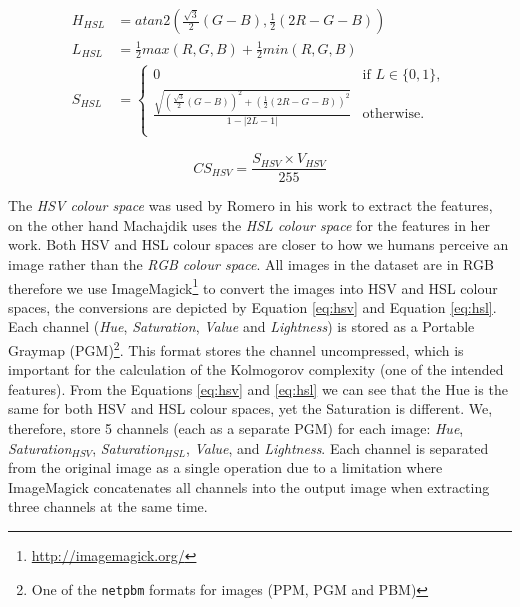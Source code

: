 \documentclass[11pt,a4paper,draft]{report}
\begin{document}
\begin{multicols}{2}
\begin{figure}[!htb]
\begin{equation}
\begin{aligned}
H_{HSL}  &= atan2\left(\frac{\sqrt{3}}{2}(G-B), \frac{1}{2}(2R-G-B)\right) \\
L_{HSL}  &= \frac{1}{2}max(R,G,B) + \frac{1}{2}min(R,G,B) \\
S_{HSL}  &= \left\{
  \begin{array}{ll}
    0  &  \text{if } L \in \{0,1\}, \\
    \frac{\sqrt{ \left(\frac{\sqrt{3}}{2}(G-B)\right)^2
               + \left(\frac{1}{2}(2R-G-B)\right)^2 }}{1 - \lvert 2L-1 \rvert}
  &  \text{otherwise}. \\
  \end{array}
           \right.
\label{eq:hsl}
\end{aligned}
\end{equation}
\end{figure}

\begin{equation}
CS_{HSV} = \frac{S_{HSV} \times V_{HSV}}{255}
\label{eq:cs}
\end{equation}

The \emph{HSV colour space} was used by Romero \cite{jma12clas} in his work to
extract the features, on the other hand Machajdik \cite{mach10clas} uses the
\emph{HSL colour space} for the features in her work.  Both HSV and HSL colour
spaces are closer to how we humans perceive an image rather than the \emph{RGB
colour space}.  All images in the dataset are in RGB therefore we use
ImageMagick\footnote{ \href{http://imagemagick.org/}{http://imagemagick.org/} }
to convert the images into HSV and HSL colour spaces, the conversions are
depicted by Equation \ref{eq:hsv} and Equation \ref{eq:hsl}.  Each channel
(\emph{Hue}, \emph{Saturation}, \emph{Value} and \emph{Lightness}) is stored as
a Portable Graymap (PGM)\footnote{One of the \texttt{netpbm} formats for images
(PPM, PGM and PBM)}.  This format stores the channel uncompressed, which is
important for the calculation of the Kolmogorov complexity (one of the intended
features).  From the Equations \ref{eq:hsv} and \ref{eq:hsl} we can see that
the Hue is the same for both HSV and HSL colour spaces, yet the Saturation is
different.  We, therefore, store 5 channels (each as a separate PGM) for each
image: \emph{Hue}, \emph{Saturation$_{HSV}$}, \emph{Saturation$_{HSL}$},
\emph{Value}, and \emph{Lightness}.  Each channel is separated from the
original image as a single operation due to a limitation where ImageMagick
concatenates all channels into the output image when extracting three channels
at the same time.


\end{multicols}
\end{document}
